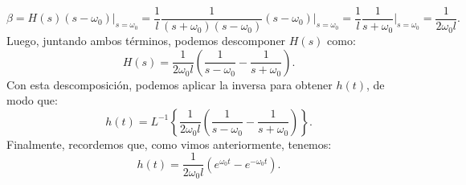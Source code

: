 \documentclass[
  11pt,
  letterpaper,
   addpoints,
   answers
  ]{exam}
\begin{document}
\begin{questions}
\begin{solution}
\begin{equation}
\beta = H(s) (s - \omega_0)\Big|_{s=\omega_0} = \frac{1}{l} \frac{1}{(s + \omega_0)(s - \omega_0)} (s - \omega_0)\Big|_{s=\omega_0} = \frac{1}{l} \frac{1}{s + \omega_0}\Big|_{s=\omega_0} = \frac{1}{2 \omega_0 l}.
\end{equation}
Luego, juntando ambos términos, podemos descomponer \(H(s)\) como:
\begin{equation}
H(s) = \frac{1}{2 \omega_0 l} \left( \frac{1}{s - \omega_0} - \frac{1}{s + \omega_0} \right).
\end{equation}
Con esta descomposición, podemos aplicar la inversa para obtener \(h(t)\), de modo que:
\begin{equation}
h(t) = L^{-1}\left\{ \frac{1}{2 \omega_0 l} \left( \frac{1}{s - \omega_0} - \frac{1}{s + \omega_0} \right) \right\}.
\end{equation}
Finalmente, recordemos que, como vimos anteriormente, tenemos:
\begin{equation}
h(t) = \frac{1}{2 \omega_0 l} \left( e^{\omega_0 t} - e^{-\omega_0 t} \right).
\end{equation}

\end{solution}
\end{questions}
\end{document}
